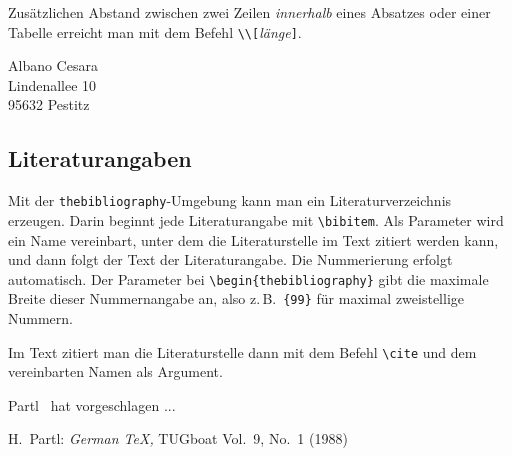  
Zusätzlichen Abstand zwischen zwei Zeilen \emph{innerhalb}
eines Absatzes oder einer Tabelle erreicht man mit dem Befehl
\lstinline|\\[|\textit{länge}\lstinline|]|.

\begin{LTXexample}
Albano Cesara \\
Lindenallee 10 \\[1.5ex]
95632 Pestitz
\end{LTXexample}




 

\subsection{Literaturangaben}

Mit der \texttt{thebibliography}-Umgebung kann man ein
Literaturverzeichnis erzeugen.
Darin beginnt jede Literaturangabe mit \lstinline|\bibitem|.
Als Parameter wird ein Name vereinbart, unter dem die
Literaturstelle im Text zitiert werden kann, und
dann folgt der Text der Literaturangabe.
Die Nummerierung erfolgt automatisch.
Der Parameter bei \lstinline|\begin{thebibliography}| gibt die
maximale Breite dieser Nummernangabe an, also z.\,B.\ 
\lstinline|{99}| für maximal zweistellige Nummern.

Im Text zitiert man die Literaturstelle dann mit dem Befehl \lstinline|\cite|
und dem vereinbarten Namen als Argument.

\let\origcite\cite
\begin{LTXexample}[preset=\let\cite\origcite]
Partl~\cite{pa} hat
vorgeschlagen ...
 
\begin{thebibliography}{99}
H.~Partl: \textit{German \TeX,}
TUGboat Vol.~9, No.~1 (1988)
\end{thebibliography}
\end{LTXexample}

